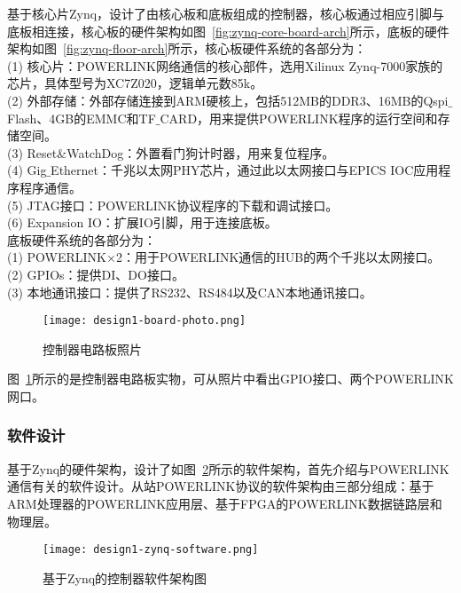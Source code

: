 基于核心片Zynq，设计了由核心板和底板组成的控制器，核心板通过相应引脚与底板相连接，核心板的硬件架构如图~\ref{fig:zynq-core-board-arch}所示，底板的硬件架构如图~\ref{fig:zynq-floor-arch}所示，核心板硬件系统的各部分为：\\
(1) 核心片：POWERLINK网络通信的核心部件，选用Xilinux Zynq-7000家族的芯片，具体型号为XC7Z020，逻辑单元数85k。\\
(2) 外部存储：外部存储连接到ARM硬核上，包括512MB的DDR3、16MB的Qspi$\_$Flash、4GB的EMMC和TF$\_$CARD，用来提供POWERLINK程序的运行空间和存储空间。\\
(3) Reset$\&$WatchDog：外置看门狗计时器，用来复位程序。\\
(4) Gig$\_$Ethernet：千兆以太网PHY芯片，通过此以太网接口与EPICS IOC应用程序程序通信。\\
(5) JTAG接口：POWERLINK协议程序的下载和调试接口。\\
(6) Expansion IO：扩展IO引脚，用于连接底板。\\

底板硬件系统的各部分为：\\
(1) POWERLINK×2：用于POWERLINK通信的HUB的两个千兆以太网接口。\\
(2) GPIOs：提供DI、DO接口。\\
(3) 本地通讯接口：提供了RS232、RS484以及CAN本地通讯接口。

\begin{figure}[!htb]
  \centering
  \texttt{[image: design1-board-photo.png]}
  \caption{控制器电路板照片}
  \label{fig:design1-board-photo}
\end{figure}

图~\ref{fig:design1-board-photo}所示的是控制器电路板实物，可从照片中看出GPIO接口、两个POWERLINK网口。

\subsubsection{软件设计}

基于Zynq的硬件架构，设计了如图~\ref{fig:design1-zynq-software}所示的软件架构，首先介绍与POWERLINK通信有关的软件设计。从站POWERLINK协议的软件架构由三部分组成：基于ARM处理器的POWERLINK应用层、基于FPGA的POWERLINK数据链路层和物理层。

\begin{figure}[!htb]
  \centering
  \texttt{[image: design1-zynq-software.png]}
  \caption{基于Zynq的控制器软件架构图}
  \label{fig:design1-zynq-software}
\end{figure}

